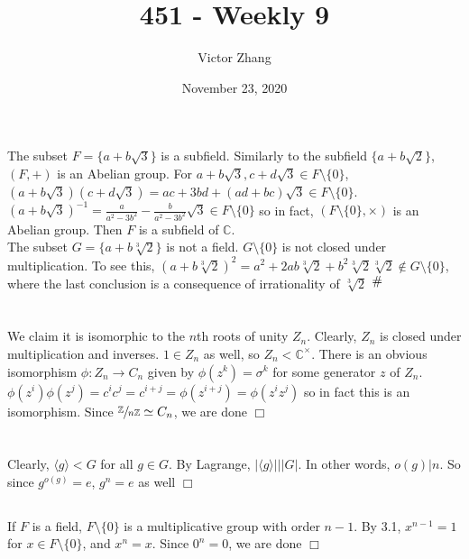 \documentclass{article}
\title{451 - Weekly 9}
\author{Victor Zhang}
\date{November 23, 2020}
\newcommand{\contra}{\raisebox{\depth}{\#}}
\begin{document}
\maketitle

\section{}
The subset $F = \{a+b\sqrt{3}\}$ is a subfield. Similarly to the subfield $\{a+b\sqrt{2}\}$, $(F,+)$ is an Abelian group. For $a+b\sqrt{3}, c+d\sqrt{3} \in F \setminus \{0\}$, $(a+b\sqrt{3})(c+d\sqrt{3}) = ac+3bd + (ad+bc)\sqrt{3} \in F \setminus \{0\}$. $(a+b\sqrt{3})^{-1} = \frac{a}{a^2-3b^2} - \frac{b}{a^2-3b^2}\sqrt{3} \in F \setminus \{0\}$ so in fact, $(F \setminus \{0\}, \times)$ is an Abelian group. Then $F$ is a subfield of $\mathbb{C}$.\\
The subset $G = \{a+b\sqrt[3]{2}\}$ is not a field. $G \setminus \{0\}$ is not closed under multiplication. To see this, $(a+b\sqrt[3]{2})^2 = a^2 + 2ab\sqrt[3]{2} + b^2\sqrt[3]{2}\sqrt[3]{2} \notin G \setminus \{0\}$, where the last conclusion is a consequence of irrationality of $\sqrt[3]{2}$ $\contra$

\section{}
We claim it is isomorphic to the $n$th roots of unity $Z_n$. Clearly, $Z_n$ is closed under multiplication and inverses. $1 \in Z_n$ as well, so $Z_n < \mathbb{C}^{\times}$. There is an obvious isomorphism $\phi : Z_n \rightarrow C_n$ given by $\phi(z^k) = \sigma^k$ for some generator $z$ of $Z_n$. $\phi(z^i)\phi(z^j) = c^ic^j = c^{i+j} = \phi(z^{i+j}) = \phi(z^iz^j)$ so in fact this is an isomorphism. Since $\sfrac{\mathbb{Z}}{n \mathbb{Z}} \simeq C_n$, we are done $\Box$

\section{}
\subsection{}
Clearly, $\langle g \rangle < G$ for all $g \in G$. By Lagrange, $\lvert \langle g \rangle \rvert \Big\vert |G|$. In other words, $o(g) \big\vert n$. So since $g^{o(g)} = e$, $g^n = e$ as well $\Box$

\subsection{}
If $F$ is a field, $F\setminus \{0\}$ is a multiplicative group with order $n-1$. By 3.1, $x^{n-1} = 1$ for $x \in F\setminus \{0\}$, and $x^n = x$. Since $0^n = 0$, we are done $\Box$
\end{document}
